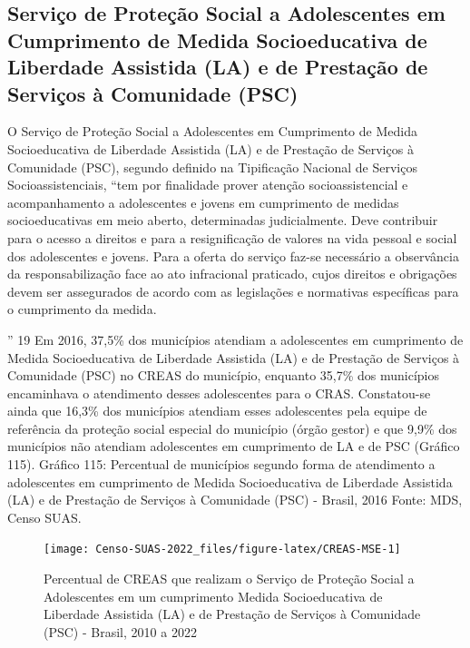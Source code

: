 \documentclass[
  brazilian]{report}
\begin{document}
\hypertarget{serviuxe7o-de-proteuxe7uxe3o-social-a-adolescentes-em-cumprimento-de-medida-socioeducativa-de-liberdade-assistida-la-e-de-prestauxe7uxe3o-de-serviuxe7os-uxe0-comunidade-psc}{%
\subsection{Serviço de Proteção Social a Adolescentes em Cumprimento de
Medida Socioeducativa de Liberdade Assistida (LA) e de Prestação de
Serviços à Comunidade
(PSC)}\label{serviuxe7o-de-proteuxe7uxe3o-social-a-adolescentes-em-cumprimento-de-medida-socioeducativa-de-liberdade-assistida-la-e-de-prestauxe7uxe3o-de-serviuxe7os-uxe0-comunidade-psc}}

O Serviço de Proteção Social a Adolescentes em Cumprimento de Medida
Socioeducativa de Liberdade Assistida (LA) e de Prestação de Serviços à
Comunidade (PSC), segundo definido na Tipificação Nacional de Serviços
Socioassistenciais, ``tem por finalidade prover atenção
socioassistencial e acompanhamento a adolescentes e jovens em
cumprimento de medidas socioeducativas em meio aberto, determinadas
judicialmente. Deve contribuir para o acesso a direitos e para a
resignificação de valores na vida pessoal e social dos adolescentes e
jovens. Para a oferta do serviço faz-se necessário a observância da
responsabilização face ao ato infracional praticado, cujos direitos e
obrigações devem ser assegurados de acordo com as legislações e
normativas específicas para o cumprimento da medida.

'' 19 Em 2016, 37,5\% dos municípios atendiam a adolescentes em
cumprimento de Medida Socioeducativa de Liberdade Assistida (LA) e de
Prestação de Serviços à Comunidade (PSC) no CREAS do município, enquanto
35,7\% dos municípios encaminhava o atendimento desses adolescentes para
o CRAS. Constatou-se ainda que 16,3\% dos municípios atendiam esses
adolescentes pela equipe de referência da proteção social especial do
município (órgão gestor) e que 9,9\% dos municípios não atendiam
adolescentes em cumprimento de LA e de PSC (Gráfico 115). Gráfico 115:
Percentual de municípios segundo forma de atendimento a adolescentes em
cumprimento de Medida Socioeducativa de Liberdade Assistida (LA) e de
Prestação de Serviços à Comunidade (PSC) - Brasil, 2016 Fonte: MDS,
Censo SUAS.

\begin{figure}
\texttt{[image: Censo-SUAS-2022\_files/figure-latex/CREAS-MSE-1]} \caption[Percentual de CREAS que realizam o Serviço de Proteção Social a Adolescentes em um cumprimento Medida Socioeducativa de Liberdade Assistida (LA) e de Prestação de Serviços à Comunidade (PSC) - Brasil, 2010 a 2022]{Percentual de CREAS que realizam o Serviço de Proteção Social a Adolescentes em um cumprimento Medida Socioeducativa de Liberdade Assistida (LA) e de Prestação de Serviços à Comunidade (PSC) - Brasil, 2010 a 2022}\label{fig:CREAS-MSE}
\end{figure}
\end{document}
